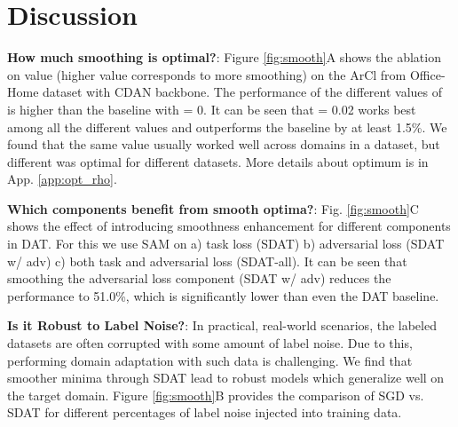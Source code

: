 \documentclass[table,dvipsnames]{article}
\theoremstyle{plain}
\theoremstyle{definition}
\theoremstyle{remark}
\begin{document}
\section{Discussion}
\label{sec:discussion}
\textbf{How much smoothing is optimal?}: Figure \ref{fig:smooth}\textcolor{mydarkblue}{A} shows the ablation on  value (higher  value corresponds to more smoothing) on the ArCl from Office-Home dataset with CDAN backbone. The performance of the different values of  is higher than the baseline with  = 0. It can be seen that  = 0.02 works best among all the different values and outperforms the baseline by at least 1.5\%. We found that the same  value usually worked well across domains in a dataset, but different  was optimal for different datasets. More details about optimum  is in App. \ref{app:opt_rho}.

\textbf{Which components benefit from smooth optima?}:
Fig. \ref{fig:smooth}C shows the effect of introducing smoothness enhancement for different components in DAT.
For this we use SAM on a) task loss (SDAT) b) adversarial loss (SDAT w/ adv) c) both task and adversarial loss (SDAT-all). It can be seen that smoothing the adversarial loss component (SDAT w/ adv) reduces the performance to 51.0\%, which is significantly lower than even the DAT baseline.

\textbf{Is it Robust to Label Noise?}: In practical, real-world scenarios, the labeled datasets are often corrupted with some amount of label noise. Due to this, performing domain adaptation with such data is challenging. We find that smoother minima through SDAT lead to robust models which generalize well on the target domain. Figure \ref{fig:smooth}\textcolor{mydarkblue}{B} provides the comparison of SGD vs. SDAT for different percentages of label noise injected into training data.
\end{document}
